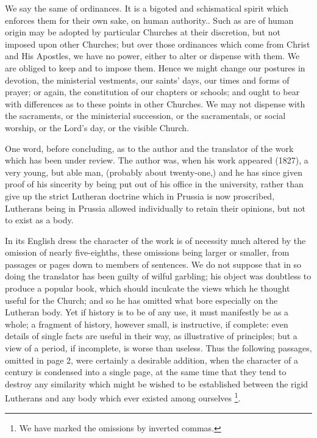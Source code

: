 We say the same of ordinances. It is a bigoted and
schismatical spirit which enforces them for their own sake, on human
authority.. Such as are of human origin may be adopted by particular
Churches at their discretion, but not imposed upon other Churches; but
over those ordinances which come from Christ and His Apostles, we have
no power, either to alter or dispense with them. We are obliged to keep
and to impose them. Hence we might change our postures in devotion, the
ministerial vestments, our saints' days, our times and forms of prayer;
or again, the constitution of our chapters or schools; and ought to bear
with differences as to these points in other Churches. We may not
dispense with the sacraments, or the ministerial succession, or the
sacramentals, or social worship, or the Lord's day, or the visible
Church.

One word, before concluding, as to the author and
the translator of the work which has been under review. The author was,
when his work appeared (1827), a very young, but able man, (probably
about twenty-one,) and he has since given proof of his sincerity by
being put out of his office in the university, rather than give up the
strict Lutheran doctrine which in Prussia is now proscribed, Lutherans
being in Prussia allowed individually to retain their opinions, but not
to exist as a body.

In its English dress the character of the work is
of necessity much altered by the omission of nearly five-eighths, these
omissions being larger or smaller, from passages or pages down to
members of sentences. We do not suppose that in so doing the translator
has been guilty of wilful garbling; his object was doubtless to produce
a popular book, which should inculcate the views which he thought useful
for the Church; and so he has omitted what bore especially on the
Lutheran body. Yet if history is to be of any use, it must manifestly be
as a whole; a fragment of history, however small, is instructive, if
complete: even details of single facts are useful in their way, as
illustrative of principles; but a view of a period, if incomplete, is
worse than useless. Thus the following passages, omitted in page 2, were
certainly a desirable addition, when the character of a century is
condensed into a single page, at the same time that they tend to destroy
any similarity which might be wished to be established between the rigid
Lutherans and any body which ever existed among ourselves \footnote{We have marked the omissions by inverted commas.}.

